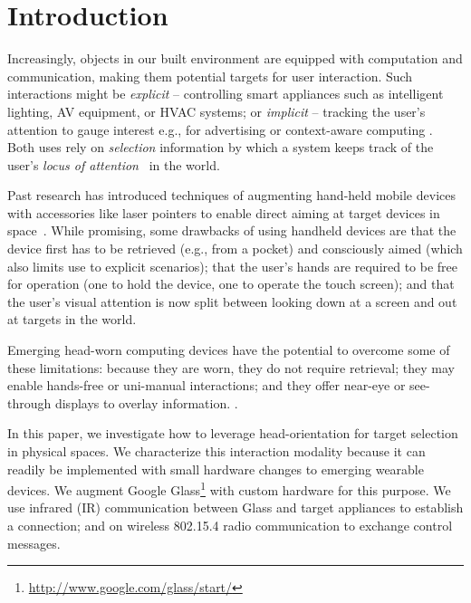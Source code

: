 \section{Introduction}

Increasingly, objects in our built environment are equipped with computation and communication, making them potential targets for user interaction. Such interactions might be {\em explicit} -- controlling smart appliances such as intelligent lighting, AV equipment, or HVAC systems; or {\em implicit} -- tracking the user's attention to gauge interest e.g., for advertising or context-aware computing . Both uses rely on {\em selection} information by which a system keeps track of the user's {\em locus of attention}~\cite{raskin} in the world.

Past research has introduced techniques of augmenting hand-held mobile devices with accessories like laser pointers to enable direct aiming at target devices in space~\cite{beigl_point_1999,patel_2-way_2003}. While promising, some drawbacks of using handheld devices are that the device first has to be retrieved (e.g., from a pocket) and consciously aimed (which also limits use to explicit scenarios); that the user's hands are required to be free for operation (one to hold the device, one to operate the touch screen); and that the user's visual attention is now split between looking down at a screen and out at targets in the world. 

Emerging head-worn computing devices have the potential to overcome some of these limitations: because they are worn, they do not require retrieval; they may enable hands-free or uni-manual interactions; and they offer near-eye or see-through displays to overlay information. .

In this paper, we investigate how to leverage head-orientation for target selection in physical spaces. We characterize this interaction modality because it can readily be implemented with small hardware changes to emerging wearable devices. We augment Google Glass\footnote{\url{http://www.google.com/glass/start/}} with custom hardware for this purpose. We use infrared (IR) communication between Glass and target appliances to establish a connection; and on wireless 802.15.4 radio communication to exchange control messages.  

